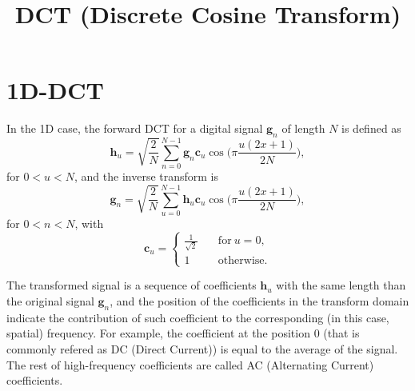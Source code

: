 
\title{DCT (Discrete Cosine Transform)}

\maketitle

\tableofcontents

\section{1D-DCT}

In the 1D case, the forward DCT for a digital signal $\mathbf{g}_n$ of
length $N$ is defined as~\cite{burger2016digital}
\begin{equation}
  {\mathbf h}_u = \sqrt{\frac{2}{N}}\sum_{n=0}^{N-1}{\mathbf
    g}_n{\mathbf c}_u\cos\Big(\pi\frac{u(2x+1)}{2N}\Big),
\end{equation}
for $0<u<N$, and the inverse transform is
\begin{equation}
  {\mathbf g}_n = \sqrt{\frac{2}{N}}\sum_{u=0}^{N-1}{\mathbf
    h}_u{\mathbf c}_u\cos\Big(\pi\frac{u(2x+1)}{2N}\Big),
\end{equation}
for $0<n<N$, with
\begin{equation}
  {\mathbf c}_u = \left\{
  \begin{array}{ll}
    \frac{1}{\sqrt{2}} & \quad \text{for}~u=0, \\
    1 & \quad \text{otherwise}.
  \end{array}
  \right.
\end{equation}

The transformed signal is a sequence of coefficients ${\mathbf h}_u$
with the same length than the original signal ${\mathbf g}_n$, and the
position of the coefficients in the transform domain indicate the
contribution of such coefficient to the corresponding (in this case,
spatial) frequency. For example, the coefficient at the position 0
(that is commonly refered as DC (Direct Current)) is equal to the
average of the signal. The rest of high-frequency coefficients are
called AC (Alternating Current) coefficients.

